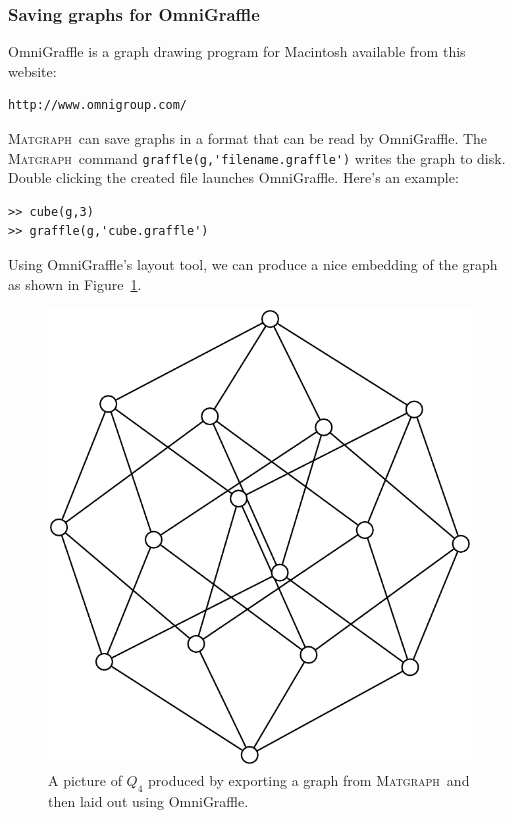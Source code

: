 \documentclass[12pt]{amsart}
\newcommand\matgraph{\textsc{Matgraph}}
\begin{document}
\subsubsection*{Saving graphs for OmniGraffle}

OmniGraffle is a graph drawing program for Macintosh available from
this website:
\begin{verbatim}
http://www.omnigroup.com/
\end{verbatim}
\matgraph\ can save graphs in a format that can be read by
OmniGraffle. The \matgraph\ command \verb|graffle(g,'filename.graffle')| writes
the graph to disk. Double clicking the created file launches
OmniGraffle. Here's an example:
\begin{verbatim}
>> cube(g,3)
>> graffle(g,'cube.graffle')
\end{verbatim}
Using OmniGraffle's layout tool, we can produce a nice embedding of
the graph as shown in Figure~\ref{fig:graffle}.
\begin{figure}[ht]
  \includegraphics[scale=0.5]{figs/graffle}
  \caption{A picture of $Q_4$ produced by exporting a graph from
    \matgraph\ and then laid out using OmniGraffle.}
  \label{fig:graffle}
\end{figure}
\end{document}
